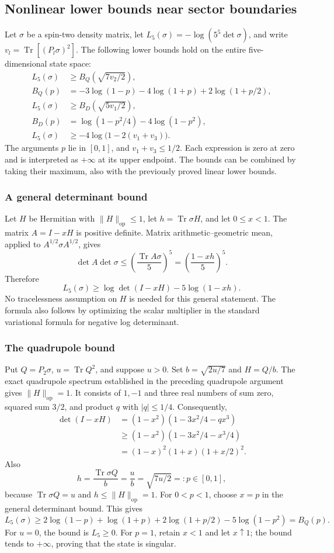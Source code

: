 \documentclass[11pt,a4paper]{article}
\newcommand{\Tr}{\operatorname{Tr}}
\begin{document}
\subsection{Nonlinear lower bounds near sector boundaries}
Let $\sigma$ be a spin-two density matrix, let
$L_5(\sigma)=-\log(5^5\det\sigma)$, and write $v_l=\Tr[(P_l\sigma)^2]$.
The following lower bounds hold on the entire five-dimensional state space:
\begin{align*}
L_5(\sigma)&\ge B_Q\left(\sqrt{7v_2/2}\right),\\
B_Q(p)&=-3\log(1-p)-4\log(1+p)+2\log(1+p/2),\\[2mm]
L_5(\sigma)&\ge B_D\left(\sqrt{5v_1/2}\right),\\
B_D(p)&=\log(1-p^2/4)-4\log(1-p^2),\\[2mm]
L_5(\sigma)&\ge-4\log\bigl(1-2(v_1+v_3)\bigr).
\end{align*}
The arguments $p$ lie in $[0,1]$, and $v_1+v_3\le1/2$.
Each expression is zero at zero and is interpreted as $+\infty$ at
its upper endpoint. The bounds can be combined by taking their maximum,
also with the previously proved linear lower bounds.

\subsubsection{A general determinant bound}
Let $H$ be Hermitian with $\|H\|_{\mathrm{op}}\le1$, let
$h=\Tr\sigma H$, and let $0\le x<1$. The matrix $A=I-xH$ is positive
definite. Matrix arithmetic--geometric mean, applied to
$A^{1/2}\sigma A^{1/2}$, gives
\[
\det A\det\sigma
\le\left(\frac{\Tr A\sigma}{5}\right)^5
=\left(\frac{1-xh}{5}\right)^5.
\]
Therefore
\[
\boxed{\quad L_5(\sigma)\ge\log\det(I-xH)-5\log(1-xh).\quad}
\]
No tracelessness assumption on $H$ is needed for this general statement.
The formula also follows by optimizing the scalar multiplier in the
standard variational formula for negative log determinant.

\subsubsection{The quadrupole bound}
Put $Q=P_2\sigma$, $u=\Tr Q^2$, and suppose $u>0$.
Set $b=\sqrt{2u/7}$ and $H=Q/b$. The exact quadrupole spectrum established
in the preceding quadrupole argument gives $\|H\|_{\mathrm{op}}=1$.
It consists of $1,-1$ and three real numbers of sum zero, squared sum
$3/2$, and product $q$ with $|q|\le1/4$. Consequently,
\begin{align*}
\det(I-xH)&=(1-x^2)(1-3x^2/4-qx^3)\\
&\ge(1-x^2)(1-3x^2/4-x^3/4)\\
&=(1-x)^2(1+x)(1+x/2)^2.
\end{align*}
Also
\[
h=\frac{\Tr\sigma Q}{b}=\frac ub=\sqrt{7u/2}=:p\in[0,1],
\]
because $\Tr\sigma Q=u$ and $h\le\|H\|_{\mathrm{op}}=1$.
For $0<p<1$, choose $x=p$ in the general determinant bound. This gives
\[
L_5(\sigma)\ge
2\log(1-p)+\log(1+p)+2\log(1+p/2)-5\log(1-p^2)
=B_Q(p).
\]
For $u=0$, the bound is $L_5\ge0$.
For $p=1$, retain $x<1$ and let $x\uparrow1$; the bound tends to
$+\infty$, proving that the state is singular.
\end{document}
